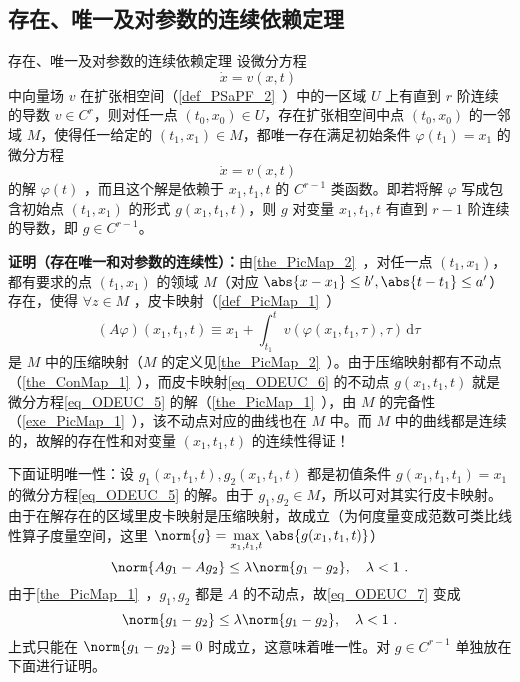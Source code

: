 \subsection{存在、唯一及对参数的连续依赖定理}
\begin{theorem}{存在、唯一及对参数的连续依赖定理}\label{the_ODEUC_1}
设微分方程
\begin{equation}\label{eq_ODEUC_9}
\dot x=v(x,t)~
\end{equation}
中向量场 $v$ 在扩张相空间（\autoref{def_PSaPF_2}~）中的一区域 $U$ 上有直到 $r$ 阶连续的导数 $v\in C^r$，则对任一点 $(t_0,x_0)\in U$，存在扩张相空间中点 $(t_0,x_0)$ 的一邻域 $M$，使得任一给定的 $(t_1,x_1)\in M$，都唯一存在满足初始条件 $\varphi(t_1)=x_1$ 的微分方程
\begin{equation}\label{eq_ODEUC_5}
\dot x=v(x,t)~
\end{equation}
的解 $\varphi(t)$ ，而且这个解是依赖于 $x_1,t_1,t$ 的 $C^{r-1}$ 类函数。即若将解 $\varphi$ 写成包含初始点 $(t_1,x_1)$ 的形式 $g(x_1,t_1,t)$，则 $g$ 对变量 $x_1,t_1,t$ 有直到 $r-1$ 阶连续的导数，即 $g\in C^{r-1}$。
\end{theorem}
\textbf{证明（存在唯一和对参数的连续性）：}由\autoref{the_PicMap_2}~，对任一点 $(t_1,x_1)$，都有要求的点 $(t_1,x_1)$ 的领域 $M$（对应 $\abs{x-x_1}\leq b',\abs{t-t_1}\leq a'$）存在，使得 $\forall z\in M$ ，皮卡映射（\autoref{def_PicMap_1}~）
\begin{equation}\label{eq_ODEUC_6}
(A\varphi)(x_1,t_1,t)\equiv x_1+\int_{t_1}^{t}v(\varphi(x_1,t_1,\tau),\tau) \,\mathrm{d}{\tau} ~
\end{equation}
是 $M$ 中的压缩映射（$M$ 的定义见\autoref{the_PicMap_2}~）。由于压缩映射都有不动点（\autoref{the_ConMap_1}~），而皮卡映射\autoref{eq_ODEUC_6} 的不动点 $g(x_1,t_1,t)$ 就是微分方程\autoref{eq_ODEUC_5} 的解（\autoref{the_PicMap_1}~），由 $M$ 的完备性（\autoref{exe_PicMap_1}~），该不动点对应的曲线也在 $M$ 中。而 $M$ 中的曲线都是连续的，故解的存在性和对变量 $(x_1,t_1,t)$ 的连续性得证！

下面证明唯一性：设 $g_1(x_1,t_1,t),g_2(x_1,t_1,t)$ 都是初值条件 $g(x_1,t_1,t_1)=x_1$ 的微分方程\autoref{eq_ODEUC_5} 的解。由于 $g_1,g_2\in M$，所以可对其实行皮卡映射。由于在解存在的区域里皮卡映射是压缩映射，故成立（为何度量变成范数可类比线性算子度量空间，这里 $\norm{g}=\max\limits_{x_1,t_1,t}\abs{g(x_1,t_1,t)}$）
\begin{equation}\label{eq_ODEUC_7}
\norm{A g_1-A g_2}\leq\lambda\norm{g_1-g_2},\quad\lambda<1~.
\end{equation}
由于\autoref{the_PicMap_1}~，$g_1,g_2$ 都是 $A$ 的不动点，故\autoref{eq_ODEUC_7} 变成
\begin{equation}
\norm{g_1-g_2}\leq\lambda\norm{g_1-g_2},\quad\lambda<1~.
\end{equation}
上式只能在 $\norm{g_1-g_2}=0$ 时成立，这意味着唯一性。对 $g\in C^{r-1}$ 单独放在下面进行证明。

